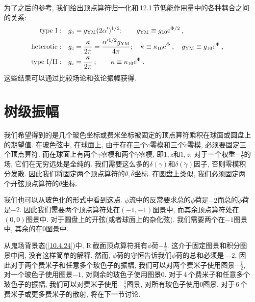为了之后的参考, 我们给出顶点算符归一化和\,12.1\,节低能作用量中的各种耦合之间的关系:
\begin{subequations}
\begin{align}
    \text{type I}:&\quad g_{\mathrm{o}}=g_{\mathrm{YM}}(2\alpha^{\prime})^{1/2}; \qquad 
    g_{\mathrm{YM}}\equiv g_{10}\mathrm{e}^{\Phi/2} \:, \label{12.3.47a} \\
    \text{heterotic}:&\quad g_{\mathrm{c}}=\frac{\kappa}{2\pi}=\frac{\alpha^{\prime1/2}g_{\mathrm{YM}}}{4\pi};
    \quad \kappa\equiv \kappa_{10}\mathrm{e}^{\Phi}\:,\quad g_{\mathrm{YM}}\equiv g_{10}\mathrm{e}^{\Phi}\:,\label{12.3.47b} \\
    \text{type I/II}:&\quad g_{\mathrm{c}}=\frac{\kappa}{2\pi}\:; \qquad \kappa\equiv \kappa_{10}\mathrm{e}^{\Phi}\:.\label{12.3.47c} 
\end{align} \label{12.3.47}
\end{subequations}
这些结果可以通过比较场论和弦论振幅获得. 



\section{树级振幅}

我们希望得到的是几个玻色坐标或费米坐标被固定的顶点算符乘积在球面或圆盘上的期望值. 在玻色弦中, 在球面上, 由于存在三个$ c $零模和三个$ \tilde{c} $零模, 必须要固定三个顶点算符. 而在球面上有两个$ \gamma $零模和两个$ \tilde{\gamma} $零模, 即$ 1,z $和$ 1,\bar{z}$: 对于一个权重$ -\frac{1}{2} $的场, 它们在无穷远处是全纯的. 我们需要这么多的$ \delta(\gamma) $和$ \delta(\tilde{\gamma}) $因子, 否则零模积分发散. 因此我们将固定两个顶点算符的$ \theta,\bar{\theta} $坐标. 在圆盘上类似, 我们必须固定两个开弦顶点算符的$ \theta $坐标.

我们也可以从玻色化的形式中看到这点. $\phi $流中的反常要求总的$ \phi $荷是$ -2 $而总的$ \tilde{\phi} $荷是$ -2$. 因此我们需要两个顶点算符处在$(-1,-1)$图景中, 而其余顶点算符处在$(0,0)$图景中. 对于圆盘上的开弦(或者球面上的杂化弦), 我们需要两个在$ -1 $图景中, 其余的在$ 0 $图景中.

从鬼场背景态(\ref{10.4.24})中, R\,截面顶点算符拥有$ \phi $荷$ -\tfrac{1}{2}$. 这介于固定图景和积分图景中间, 没有这样简单的解释. 然而, $\phi $荷的守恒告诉我们$ \phi $荷的总和必须是 $-2$. 因此对于两个费米子和任意多个玻色子的振幅, 我们可以对两个费米子使用图景$ -\tfrac{1}{2}$, 对一个玻色子使用图景$-1$, 对剩余的玻色子使用图景$ 0$. 对于\,4\,个费米子和任意多个玻色子的振幅, 我们可以对费米子使用$ -\frac{1}{2} $图景, 对所有玻色子使用$ 0 $图景. 对于\,6\,个费米子或更多费米子的散射, 将在下一节讨论.

